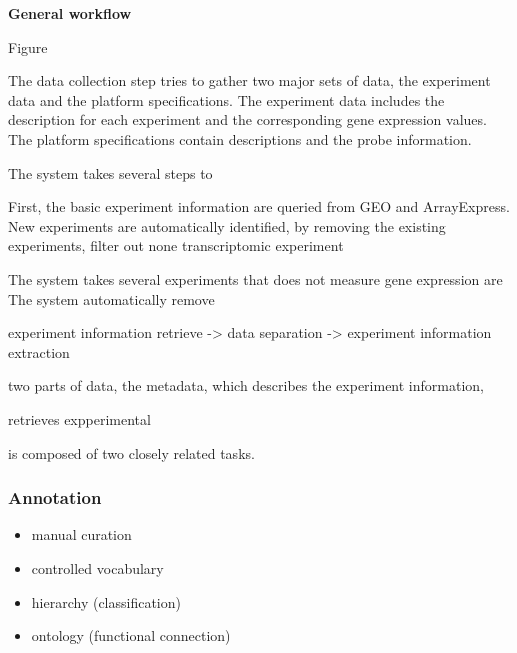\textbf{General workflow}

Figure


The data collection step tries to gather two major sets of data, the experiment 
data and the platform specifications. 
%
The experiment data includes the description for each experiment and the 
corresponding gene expression values. 
The platform specifications contain descriptions and the probe 
information. 
%

The system takes several steps to 

First, the basic experiment information are queried from GEO and ArrayExpress.
New experiments are automatically identified, by removing the existing 
experiments, filter out none transcriptomic experiment 

The system takes several experiments that does not measure gene expression are  
The system automatically remove

experiment information retrieve -> data separation -> experiment information 
extraction 


two 
parts of data, the metadata, which describes the experiment information, 
  
retrieves expperimental 

is composed of two closely related tasks.









\subsubsection{Annotation}


\begin{itemize}
\item manual curation
\item controlled vocabulary
\item hierarchy (classification)
\item ontology (functional connection)
\end{itemize}


